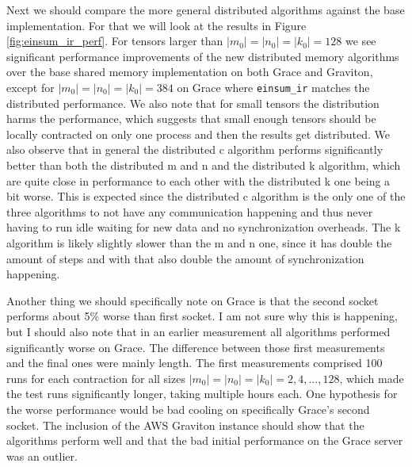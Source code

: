 Next we should compare the more general distributed algorithms against the base implementation.
For that we will look at the results in Figure \ref{fig:einsum_ir_perf}.
For tensors larger than $|m_0|=|n_0|=|k_0|=128$ we see significant performance improvements of the new distributed memory algorithms over the base shared memory implementation on both Grace and Graviton, except for $|m_0|=|n_0|=|k_0|=384$ on Grace where \texttt{einsum\_ir} matches the distributed performance.
We also note that for small tensors the distribution harms the performance, which suggests that small enough tensors should be locally contracted on only one process and then the results get distributed.
We also observe that in general the distributed c algorithm performs significantly better than both the distributed m and n and the distributed k algorithm, which are quite close in performance to each other with the distributed k one being a bit worse.
This is expected since the distributed c algorithm is the only one of the three algorithms to not have any communication happening and thus never having to run idle waiting for new data and no synchronization overheads.
The k algorithm is likely slightly slower than the m and n one, since it has double the amount of steps and with that also double the amount of synchronization happening.

Another thing we should specifically note on Grace is that the second socket performs about 5\% worse than first socket.
I am not sure why this is happening, but I should also note that in an earlier measurement all algorithms performed significantly worse on Grace.
The difference between those first measurements and the final ones were mainly length.
The first measurements comprised 100 runs for each contraction for all sizes $|m_0|=|n_0|=|k_0|=2,4,...,128$, which made the test runs significantly longer, taking multiple hours each.
One hypothesis for the worse performance would be bad cooling on specifically Grace's second socket.
The inclusion of the AWS Graviton instance should show that the algorithms perform well and that the bad initial performance on the Grace server was an outlier.


